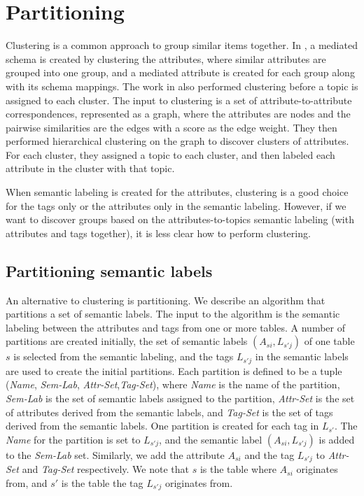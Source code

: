 \section{Partitioning}
\label{sec:Partitioning}

Clustering is a common approach to group similar items together. In \cite{ilprints851}, a mediated schema is created by clustering the attributes, where similar attributes are grouped into one group, and a mediated attribute is created for each group along with its schema mappings. The work in \cite{Smith2011Unity} also performed clustering before a topic is assigned to each cluster. The input to clustering is a set of attribute-to-attribute correspondences, represented as a graph, where the attributes are nodes and the pairwise similarities are the edges with a score as the edge weight. They then performed hierarchical clustering on the graph to discover clusters of attributes. For each cluster, they assigned a topic to each cluster, and then labeled each attribute in the cluster with that topic.

When semantic labeling is created for the attributes, clustering is a good choice for the tags only or the attributes only in the semantic labeling. However, if we want to discover groups based on the attributes-to-topics semantic labeling (with attributes and tags together), it is less clear how to perform clustering.

\subsection{Partitioning semantic labels}
\label{ssec:PartitioningSemanticLabels}

An alternative to clustering is partitioning. We describe an algorithm that partitions a set of semantic labels. The input to the algorithm is the semantic labeling between the attributes and tags from one or more tables. A number of partitions are created initially, the set of semantic labels $(A_{si},L_{s'j})$ of one table $s$ is selected from the semantic labeling, and the tags $L_{s'j}$ in the semantic labels are used to create the initial partitions. Each partition is defined to be a tuple (\textit{Name}, \textit{Sem-Lab}, \textit{Attr-Set},\textit{Tag-Set}), where \textit{Name} is the name of the partition, \textit{Sem-Lab} is the set of semantic labels assigned to the partition, \textit{Attr-Set} is the set of attributes derived from the semantic labels, and \textit{Tag-Set} is the set of tags derived from the semantic labels. One partition is created for each tag in $L_{s'}$. The \textit{Name} for the partition is set to $L_{s'j}$, and the semantic label $(A_{si},L_{s'j})$ is added to the \textit{Sem-Lab} set. Similarly, we add the attribute $A_{si}$ and the tag $L_{s'j}$ to \textit{Attr-Set} and \textit{Tag-Set} respectively. We note that $s$ is the table where $A_{si}$ originates from, and $s'$ is the table the tag $L_{s'j}$ originates from.

